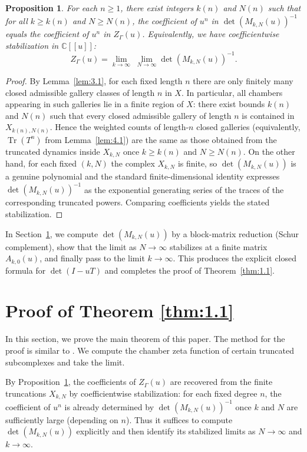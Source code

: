 \documentclass[11pt]{amsart}
\newtheorem{prop}[thm]{Proposition}
\theoremstyle{definition}
\theoremstyle{remark}
\numberwithin{equation}{section}
\begin{document}
\begin{prop}\label{prop:bridge_traces_to_matrices}
For each $n\ge 1$, there exist integers $k(n)$ and $N(n)$ such that for all $k\ge k(n)$ and $N\ge N(n)$,
the coefficient of $u^n$ in $\det(M_{k,N}(u))^{-1}$ equals the coefficient of $u^n$ in $Z_\Gamma(u)$.
Equivalently, we have coefficientwise stabilization in $\mathbb{C}[\![u]\!]$:
\[
Z_\Gamma(u)
=
\lim_{k\to\infty}\;\lim_{N\to\infty}\det(M_{k,N}(u))^{-1}.
\]
\end{prop}

\begin{proof}[Proof]
By Lemma~\ref{lem:3.1}, for each fixed length $n$ there are only finitely many closed admissible gallery classes of
length $n$ in $X$. In particular, all chambers appearing in such galleries lie in a finite region of $X$:
there exist bounds $k(n)$ and $N(n)$ such that every closed admissible gallery of length $n$ is contained in $X_{k(n),N(n)}$.
Hence the weighted counts of length-$n$ closed galleries (equivalently, $\operatorname{Tr}(T^n)$ from Lemma~\ref{lem:4.1})
are the same as those obtained from the truncated dynamics inside $X_{k,N}$ once $k\ge k(n)$ and $N\ge N(n)$.
On the other hand, for each fixed $(k,N)$ the complex $X_{k,N}$ is finite, so $\det(M_{k,N}(u))$ is a genuine polynomial
and the standard finite-dimensional identity expresses $\det(M_{k,N}(u))^{-1}$ as the exponential generating series of
the traces of the corresponding truncated powers. Comparing coefficients yields the stated stabilization.
\end{proof}

In Section~\ref{sec:5}, we compute $\det(M_{k,N}(u))$ by a block-matrix reduction (Schur complement),
show that the limit as $N\to\infty$ stabilizes at a finite matrix $A_{k,0}(u)$, and finally pass to the limit $k\to\infty$.
This produces the explicit closed formula for $\det(I-uT)$ and completes the proof of Theorem~\ref{thm:1.1}.




\section{Proof of Theorem \ref{thm:1.1}}\label{sec:5}
In this section, we prove the main theorem of this paper. The method for the proof is similar to \cite{HK3}. We compute the chamber zeta function of certain truncated subcomplexes and take the limit.

By Proposition~\ref{prop:bridge_traces_to_matrices}, the coefficients of $Z_\Gamma(u)$ are recovered
from the finite truncations $X_{k,N}$ by coefficientwise stabilization:
for each fixed degree $n$, the coefficient of $u^n$ is already determined by $\det(M_{k,N}(u))^{-1}$
once $k$ and $N$ are sufficiently large (depending on $n$).
Thus it suffices to compute $\det(M_{k,N}(u))$ explicitly and then identify its stabilized limits as $N\to\infty$ and $k\to\infty$.
\end{document}
